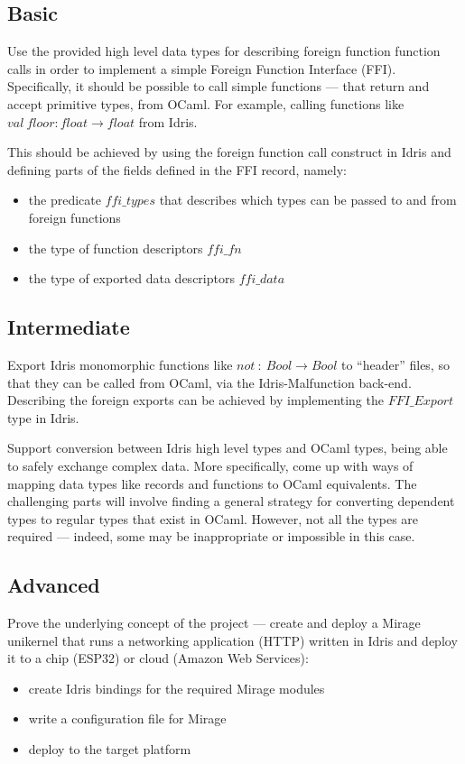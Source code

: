 \documentclass[a4paper, 12pt, oneside]{report}
\begin{document}
\subsection{Basic}
Use the provided high level data types for describing foreign function
function calls in order to implement a simple Foreign Function Interface (FFI).
Specifically, it should be possible to call simple
functions --- that return
and accept primitive types, from OCaml.
For example, calling functions like
$val \ floor : float \rightarrow float$ from Idris.

This should be achieved by using the foreign function call construct in Idris
and defining parts of the fields defined in the FFI record, namely:
\begin{itemize}
	\item the predicate $ffi\_types$ that describes which types can be
	      passed to and from foreign functions
	\item the type of function descriptors $ffi\_fn$
	\item the type of exported data descriptors $ffi\_data$
\end{itemize}

\subsection{Intermediate}
Export Idris monomorphic functions like
$not \ : \ Bool \rightarrow Bool$ to ``header'' files, so that they can be
called from OCaml, via the Idris-Malfunction back-end.
Describing the foreign exports can be achieved by implementing the
$FFI\_Export$ type in Idris.

Support conversion between Idris high level types and OCaml types,
being able to safely exchange complex data.
More specifically, come up with ways of mapping data types like records and
functions to OCaml equivalents.
The challenging parts will involve finding a general strategy for converting
dependent types to regular types that exist in OCaml. However, not all the types are required --- indeed, some may be inappropriate or impossible in this
case.

\subsection{Advanced}
Prove the underlying concept of the project --- create and deploy a Mirage
unikernel that runs a networking application (HTTP) written in Idris and
deploy it to a chip (ESP32) or cloud (Amazon Web Services):
\begin{itemize}
	\item create Idris bindings for the required Mirage modules
	\item write a configuration file for Mirage
	\item deploy to the target platform
\end{itemize}
\end{document}
